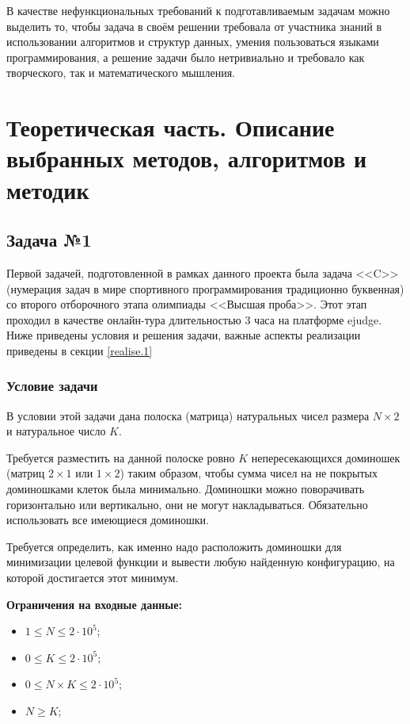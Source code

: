 \documentclass[a4paper]{article}
\begin{document}
В качестве нефункциональных требований к подготавливаемым задачам можно выделить то, чтобы задача в своём решении требовала от участника знаний в использовании алгоритмов и структур данных, умения пользоваться языками программирования, а решение задачи было нетривиально и требовало как творческого, так и математического мышления.

\newpage

\section{Теоретическая часть. Описание выбранных методов, алгоритмов и методик}

\subsection{Задача №1}

Первой задачей, подготовленной в рамках данного проекта была задача <<C>> (нумерация задач в мире спортивного программирования традиционно буквенная) со второго отборочного этапа олимпиады <<Высшая проба>>. Этот этап проходил в качестве онлайн-тура длительностью 3 часа на платформе ejudge. Ниже приведены условия и решения задачи, важные аспекты реализации приведены в секции \ref{realise.1}

\subsubsection{Условие задачи}

В условии этой задачи дана полоска (матрица) натуральных чисел размера $N \times 2$ и натуральное число $K$.

Требуется разместить на данной полоске ровно $K$ непересекающихся доминошек (матриц $2\times1$ или $1\times 2$) таким образом, чтобы сумма чисел на не покрытых доминошками клеток была минимально. Доминошки можно поворачивать горизонтально или вертикально, они не могут накладываться. Обязательно использовать все имеющиеся доминошки.

Требуется определить, как именно надо расположить доминошки для минимизации целевой функции и вывести любую найденную конфигурацию, на которой достигается этот минимум.

\textbf{Ограничения на входные данные:}
\begin{itemize}
    \item $1 \leqslant N \leqslant 2 \cdot 10^{5}$;
    \item $0 \leqslant K \leqslant 2 \cdot 10^{5}$;
    \item $0 \leqslant N \times K \leqslant 2 \cdot 10^{5}$;
    \item $N \geqslant K$;
\end{itemize}
\end{document}

